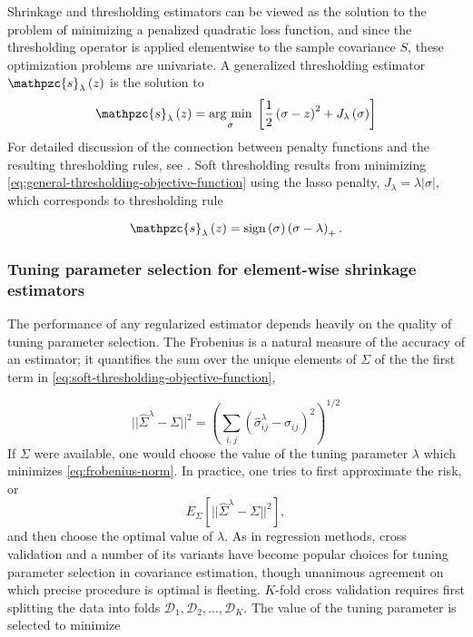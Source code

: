 \documentclass[12pt]{article}
\newcommand{\argmin}[1]{\underset{#1}{\operatorname{arg}\,\operatorname{min}}\;}
\theoremstyle{definition}
\begin{document}
Shrinkage and thresholding estimators can be viewed as the solution to the problem of minimizing a penalized quadratic loss function, and since the thresholding operator is applied elementwise to the sample covariance $S$,  these optimization problems are univariate. A generalized thresholding estimator $\mathpzc{s}_\lambda\left( z \right)$ is the solution to
\begin{equation} \label{eq:general-thresholding-objective-function}
\mathpzc{s}_\lambda\left( z \right)  = \argmin{\sigma} \left[ \frac{1}{2} \left(\sigma - z\right)^2 + J_\lambda\left(\sigma \right)\right]
\end{equation}
\noindent
For detailed discussion of the connection between penalty functions and the resulting thresholding rules, see \citet{antoniadis2001regularization}. Soft thresholding results from minimizing \ref{eq:general-thresholding-objective-function} using the lasso penalty, $J_\lambda = \lambda \vert \sigma \vert$, which corresponds to thresholding rule

\begin{equation} 
\mathpzc{s}_\lambda\left( z \right) = \textup{sign}\left(\sigma\right) \left(\sigma  - \lambda\right)_+.
\end{equation}

\subsubsection{Tuning parameter selection for element-wise shrinkage estimators}

The performance of any regularized estimator depends heavily on the quality of tuning parameter selection. The Frobenius is a natural measure of the accuracy of an estimator; it quantifies the sum over the unique elements of $\Sigma$ of the the first term in \ref{eq:soft-thresholding-objective-function}, 

\begin{equation} \label{eq:forbenius-norm}
\vert \vert  \hat{\Sigma}^\lambda - \Sigma \vert \vert^2 = \left(\sum_{i,j} \left(\hat{\sigma}^\lambda_{ij} - \sigma_{ij} \right)^2\right)^{1/2}
\end{equation}
\noindent
If $\Sigma$ were available, one would choose the value of the tuning parameter $\lambda$ which minimizes \ref{eq:frobenius-norm}. In practice, one tries to first approximate the risk, or 
\[
E_\Sigma\left[\vert \vert  \hat{\Sigma}^\lambda - \Sigma \vert \vert^2 \right],
\]
\noindent
and then choose the optimal value of $\lambda$.  As in regression methods, cross validation and a number of its variants have become popular choices for tuning parameter selection in covariance estimation, though unanimous agreement on which precise procedure is optimal is fleeting.  $K$-fold cross validation requires first splitting the data into folds $\mathcal{D}_1, \mathcal{D}_2, \dots, \mathcal{D}_K$. The value of the tuning parameter is selected to minimize
\end{document}
